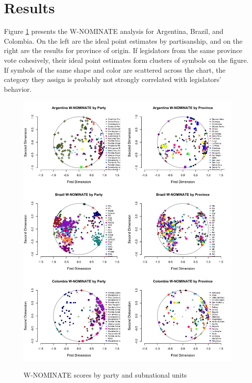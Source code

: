 \documentclass[a4paper,12pt]{article}
\begin{document}
\section{Results}
\label{sec:results}

Figure \ref{fig:wnom} presents the W-NOMINATE analysis for Argentina, Brazil, and Colombia. On the left are the ideal point estimates by partisanship, and on the right are the results for province of origin. If legislators from the same province vote cohesively, their ideal point estimates form clusters of symbols on the figure. If symbols of the same shape and color are scattered across the chart, the category they assign is probably not strongly correlated with legislators' behavior. %

\begin{figure}[p]
\begin{center}
\caption{W-NOMINATE scores by party and subnational units}
\vspace{.3cm}
\includegraphics[width=17cm]{partyProvBehavior.png}
\label{fig:wnom}
\end{center}
\end{figure}
\end{document}
